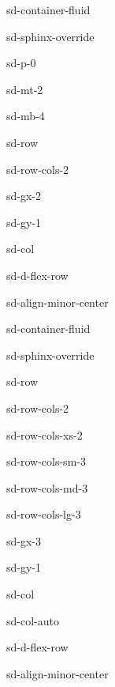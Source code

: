 \documentclass[letterpaper,10pt,english]{jupyterBook}
\begin{document}
\begin{sphinxuseclass}{sd-container-fluid}
\begin{sphinxuseclass}{sd-sphinx-override}
\begin{sphinxuseclass}{sd-p-0}
\begin{sphinxuseclass}{sd-mt-2}
\begin{sphinxuseclass}{sd-mb-4}
\begin{sphinxuseclass}{sd-row}
\begin{sphinxuseclass}{sd-row-cols-2}
\begin{sphinxuseclass}{sd-gx-2}
\begin{sphinxuseclass}{sd-gy-1}
\begin{sphinxuseclass}{sd-col}
\begin{sphinxuseclass}{sd-d-flex-row}
\begin{sphinxuseclass}{sd-align-minor-center}
\begin{sphinxuseclass}{sd-container-fluid}
\begin{sphinxuseclass}{sd-sphinx-override}
\begin{sphinxuseclass}{sd-row}
\begin{sphinxuseclass}{sd-row-cols-2}
\begin{sphinxuseclass}{sd-row-cols-xs-2}
\begin{sphinxuseclass}{sd-row-cols-sm-3}
\begin{sphinxuseclass}{sd-row-cols-md-3}
\begin{sphinxuseclass}{sd-row-cols-lg-3}
\begin{sphinxuseclass}{sd-gx-3}
\begin{sphinxuseclass}{sd-gy-1}
\begin{sphinxuseclass}{sd-col}
\begin{sphinxuseclass}{sd-col-auto}
\begin{sphinxuseclass}{sd-d-flex-row}
\begin{sphinxuseclass}{sd-align-minor-center}
\end{sphinxuseclass}
\end{sphinxuseclass}
\end{sphinxuseclass}
\end{sphinxuseclass}
\end{sphinxuseclass}
\end{sphinxuseclass}
\end{sphinxuseclass}
\end{sphinxuseclass}
\end{sphinxuseclass}
\end{sphinxuseclass}
\end{sphinxuseclass}
\end{sphinxuseclass}
\end{sphinxuseclass}
\end{sphinxuseclass}
\end{sphinxuseclass}
\end{sphinxuseclass}
\end{sphinxuseclass}
\end{sphinxuseclass}
\end{sphinxuseclass}
\end{sphinxuseclass}
\end{sphinxuseclass}
\end{sphinxuseclass}
\end{sphinxuseclass}
\end{sphinxuseclass}
\end{sphinxuseclass}
\end{sphinxuseclass}
\end{document}
